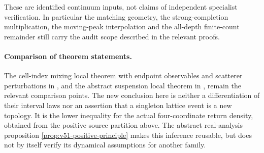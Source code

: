 These are identified continuum inputs, not claims of independent
specialist verification. In particular the matching geometry, the
strong-completion multiplication, the moving-peak interpolation and
the all-depth finite-count remainder still carry the audit scope
described in the relevant proofs.

\paragraph{Comparison of theorem statements.}
The cell-index mixing local theorem with endpoint observables and
scatterer perturbations in \cite{DPZ}, and the abstract suspension
local theorem in \cite{DN}, remain the relevant comparison points.
The new conclusion here is neither a differentiation of their interval
laws nor an assertion that a singleton lattice event is a new topology.
It is the lower inequality for the actual four-coordinate return
density, obtained from the positive source partition above. The abstract
real-analysis proposition \ref{prop:v51-positive-principle} makes
this inference reusable, but does not by itself verify its dynamical
assumptions for another family.
